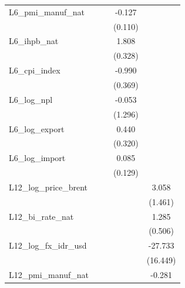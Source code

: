 {\begin{tabular}{l*{4}{c}}
\addlinespace
L6\_pmi\_manuf\_nat&                  &                  &   -0.127         &                  \\
                &                  &                  &  (0.110)         &                  \\
\addlinespace
L6\_ihpb\_nat     &                  &                  &    1.808\sym{***}&                  \\
                &                  &                  &  (0.328)         &                  \\
\addlinespace
L6\_cpi\_index    &                  &                  &   -0.990\sym{***}&                  \\
                &                  &                  &  (0.369)         &                  \\
\addlinespace
L6\_log\_npl      &                  &                  &   -0.053         &                  \\
                &                  &                  &  (1.296)         &                  \\
\addlinespace
L6\_log\_export   &                  &                  &    0.440         &                  \\
                &                  &                  &  (0.320)         &                  \\
\addlinespace
L6\_log\_import   &                  &                  &    0.085         &                  \\
                &                  &                  &  (0.129)         &                  \\
\addlinespace
L12\_log\_price\_brent&                  &                  &                  &    3.058\sym{**} \\
                &                  &                  &                  &  (1.461)         \\
\addlinespace
L12\_bi\_rate\_nat &                  &                  &                  &    1.285\sym{**} \\
                &                  &                  &                  &  (0.506)         \\
\addlinespace
L12\_log\_fx\_idr\_usd&                  &                  &                  &  -27.733\sym{*}  \\
                &                  &                  &                  & (16.449)         \\
\addlinespace
L12\_pmi\_manuf\_nat&                  &                  &                  &   -0.281\sym{*}  \\

\end{tabular}}

